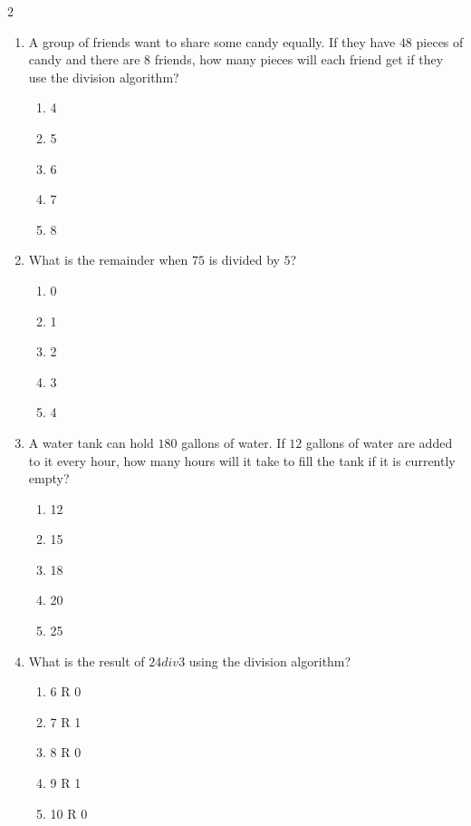 \documentclass[10pt]{article}
\begin{document}
\begin{multicols}{2}
\begin{enumerate}[label=\textbf{Q\arabic*.}, leftmargin=*, itemsep=6pt, parsep=0pt]
  \item \small A group of friends want to share some candy equally. If they have $48$ pieces of candy and there are $8$ friends, how many pieces will each friend get if they use the division algorithm?
  \begin{enumerate}[label=(\Alph*), leftmargin=0.6cm, nosep, itemsep=2pt]
    \item 4
    \item 5
    \item 6
    \item 7
    \item 8
  \end{enumerate}

  \item \small What is the remainder when $75$ is divided by $5$?
  \begin{enumerate}[label=(\Alph*), leftmargin=0.6cm, nosep, itemsep=2pt]
    \item 0
    \item 1
    \item 2
    \item 3
    \item 4
  \end{enumerate}

  \item \small A water tank can hold $180$ gallons of water. If $12$ gallons of water are added to it every hour, how many hours will it take to fill the tank if it is currently empty?
  \begin{enumerate}[label=(\Alph*), leftmargin=0.6cm, nosep, itemsep=2pt]
    \item 12
    \item 15
    \item 18
    \item 20
    \item 25
  \end{enumerate}

  \item \small What is the result of $24 div 3$ using the division algorithm?
  \begin{enumerate}[label=(\Alph*), leftmargin=0.6cm, nosep, itemsep=2pt]
    \item 6 R 0
    \item 7 R 1
    \item 8 R 0
    \item 9 R 1
    \item 10 R 0
  \end{enumerate}


\end{enumerate}
\end{multicols}
\end{document}

